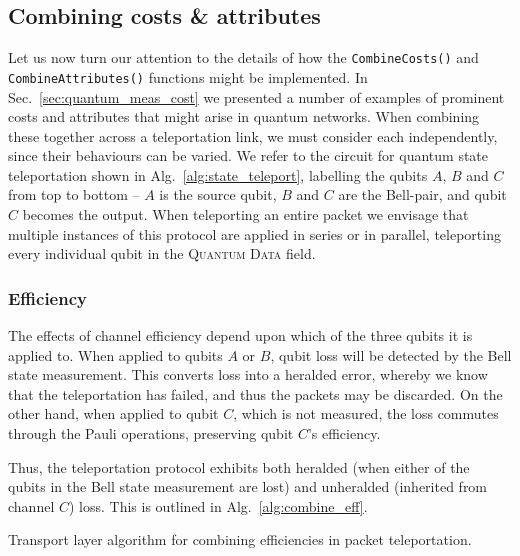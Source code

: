 \documentclass[aps,rmp,twocolumn,amsmath,amssymb,nofootinbib,superscriptaddress,longbibliography,floatfix,table-of-contents,eqsecnum]{revtex4-1}
\begin{document}
%
%

\subsection{Combining costs \& attributes} 

Let us now turn our attention to the details of how the \texttt{CombineCosts()} and \texttt{CombineAttributes()} functions might be implemented. In Sec.~\ref{sec:quantum_meas_cost} we presented a number of examples of prominent costs and attributes that might arise in quantum networks. When combining these together across a teleportation link, we must consider each independently, since their behaviours can be varied. We refer to the circuit for quantum state teleportation shown in Alg.~\ref{alg:state_teleport}, labelling the qubits $A$, $B$ and $C$ from top to bottom -- $A$ is the source qubit, $B$ and $C$ are the Bell-pair, and qubit $C$ becomes the output. When teleporting an entire packet we envisage that multiple instances of this protocol are applied in series or in parallel, teleporting every individual qubit in the \textsc{Quantum Data} field.

%
%

\subsubsection{Efficiency} 

The effects of channel efficiency depend upon which of the three qubits it is applied to. When applied to qubits $A$ or $B$, qubit loss will be detected by the Bell state measurement. This converts loss into a heralded error, whereby we know that the teleportation has failed, and thus the packets may be discarded. On the other hand, when applied to qubit $C$, which is not measured, the loss commutes through the Pauli operations, preserving qubit $C$'s efficiency.

Thus, the teleportation protocol exhibits both heralded (when either of the qubits in the Bell state measurement are lost) and unheralded (inherited from channel $C$) loss. This is outlined in Alg.~\ref{alg:combine_eff}.

\begin{table}[!htb]
\caption{Transport layer algorithm for combining efficiencies in packet teleportation.} \label{alg:combine_eff}
\end{table}
\end{document}
